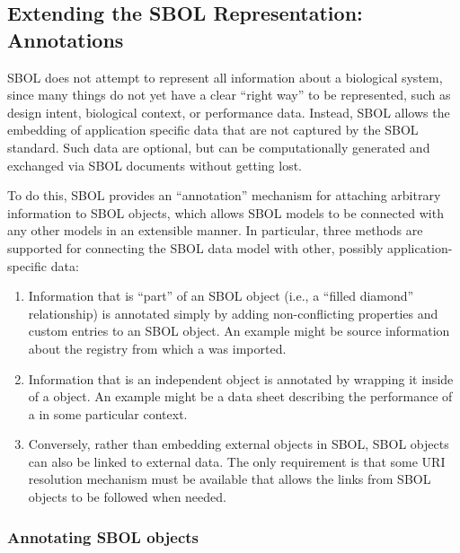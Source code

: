 \subsection{Extending the SBOL Representation:  Annotations}
\label{sec:Annotations}
\label{sec:annotations}


SBOL does not attempt to represent all information about a biological system, since many things do not yet have a clear ``right way'' to be represented, such as design intent, biological context, or performance data.  Instead, SBOL allows the embedding of application specific data that are not captured by the SBOL standard.  Such data are optional, but can be computationally generated and exchanged via SBOL documents without getting lost. 

To do this, SBOL provides an ``annotation'' mechanism for attaching arbitrary information to SBOL objects, which allows SBOL models to be connected with any other models in an extensible manner.
In particular, three methods are supported for connecting the SBOL data model with other, possibly application-specific data:
\begin{enumerate}
\item Information that is ``part'' of an SBOL object (i.e., a ``filled diamond'' relationship) is annotated simply by adding non-conflicting properties and custom entries to an SBOL object.  An example might be source information about the registry from which a  was imported.
\item Information that is an independent object is annotated by wrapping it inside of a  object.  An example might be a data sheet describing the performance of a  in some particular context.
\item Conversely, rather than embedding external objects in SBOL, SBOL objects can also be linked to external data.  The only requirement is that some URI resolution mechanism must be available that allows the links from SBOL objects to be followed when needed.
\end{enumerate}

\subsubsection{Annotating SBOL objects}
\label{sec:value}
\label{sec:Annotation}
\label{sec:AnnotationValue}
\label{sec:ListOfAnnotations}

